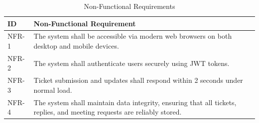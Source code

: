 \begin{table}[H]
\centering
\footnotesize
\begin{tabularx}{\textwidth}{|p{1.5cm}|L|} 
\hline
\textbf{ID} & \textbf{Non-Functional Requirement} \\
\hline
NFR-1 & The system shall be accessible via modern web browsers on both desktop and mobile devices. \\
\hline
NFR-2 & The system shall authenticate users securely using JWT tokens. \\
\hline
NFR-3 & Ticket submission and updates shall respond within 2 seconds under normal load. \\
\hline
NFR-4 & The system shall maintain data integrity, ensuring that all tickets, replies, and meeting requests are reliably stored. \\
\hline
\end{tabularx}
\caption{Non-Functional Requirements}
\label{tab:nfr}

\end{table}

